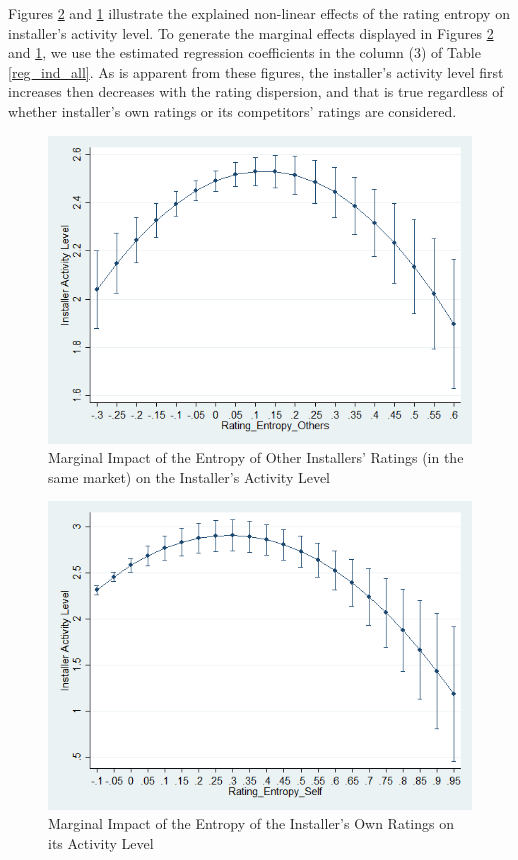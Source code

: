 \documentclass[msom,blindrev]{informs3}
\begin{document}
Figures \ref{fig: marginsplot_ind_ent_self} and  \ref{fig: marginsplot_ind_ent_others} illustrate the explained non-linear effects of the rating entropy on installer's activity level. To generate the marginal effects displayed in Figures \ref{fig: marginsplot_ind_ent_self} and  \ref{fig: marginsplot_ind_ent_others}, we use the estimated regression coefficients in the column (3) of Table \ref{reg_ind_all}. As is apparent from these figures, the installer's activity level first increases then decreases with the rating dispersion, and that is true regardless of whether installer's own ratings or its competitors' ratings are considered.

\begin{figure}
	\centering
	\includegraphics[width=0.7\linewidth]{marginsplot_entothers.png}
	\caption{Marginal Impact of the Entropy of Other Installers' Ratings (in the same market) on the Installer's Activity Level}
	\label{fig: marginsplot_ind_ent_others}
\end{figure}



\begin{figure}
	\centering
	\includegraphics[width=0.7\linewidth]{marginsplot_entself.png}
	\caption{Marginal Impact of the Entropy of the Installer's Own Ratings on its Activity Level}
	\label{fig: marginsplot_ind_ent_self}
\end{figure}
\end{document}

